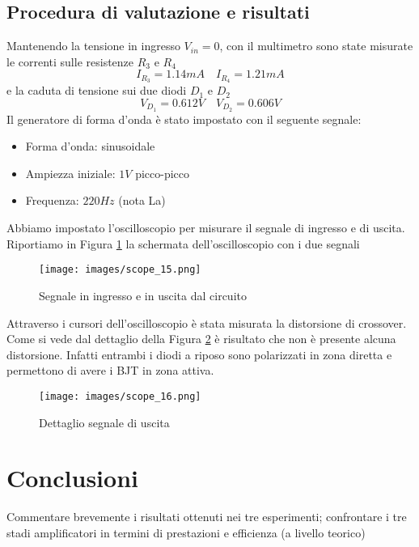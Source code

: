 \subsection{Procedura di valutazione e risultati}
Mantenendo la tensione in ingresso $V_{in}=0$, con il multimetro sono state misurate le correnti sulle resistenze $R_3$ e $R_4$
\begin{equation*}
    I_{R_3}=1.14mA\quad I_{R_4}=1.21mA
\end{equation*}
e la caduta di tensione sui due diodi $D_1$ e $D_2$
\begin{equation*}
    V_{D_1}=0.612V\quad V_{D_2}=0.606V
\end{equation*}
\clearpage 
Il generatore di forma d'onda è stato impostato con il seguente segnale:
\begin{itemize}
    \item Forma d'onda: sinusoidale
    \item Ampiezza iniziale: $1V$ picco-picco
    \item Frequenza: $220Hz$ (nota La)
\end{itemize}
Abbiamo impostato l'oscilloscopio per misurare il segnale di ingresso e di uscita. Riportiamo in Figura \ref{fig:scope_15} la schermata dell'oscilloscopio con i due segnali
\begin{figure}[H]
    \centering
    \texttt{[image: images/scope\_15.png]}
    \caption{Segnale in ingresso e in uscita dal circuito}
    \label{fig:scope_15}
\end{figure}
Attraverso i cursori dell'oscilloscopio è stata misurata la distorsione di crossover. Come si vede dal dettaglio della Figura \ref{fig:scope_16} è risultato che non è presente alcuna distorsione. Infatti entrambi i diodi a riposo sono polarizzati in zona diretta e permettono di avere i BJT in zona attiva.
\begin{figure}[H]
    \centering
    \texttt{[image: images/scope\_16.png]}
    \caption{Dettaglio segnale di uscita}
    \label{fig:scope_16}
\end{figure}

\section{Conclusioni}
Commentare brevemente i risultati ottenuti nei tre esperimenti; confrontare i tre stadi amplificatori in termini di prestazioni e efficienza (a livello teorico)